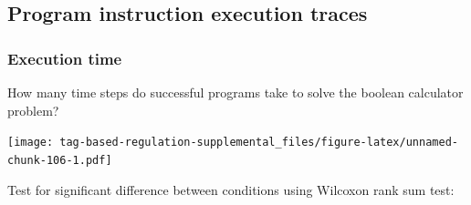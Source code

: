 \documentclass[]{book}
\newenvironment{Shaded}{\begin{snugshade}}{\end{snugshade}}
\newcommand{\CommentTok}[1]{\textcolor[rgb]{0.56,0.35,0.01}{\textit{#1}}}
\newcommand{\DataTypeTok}[1]{\textcolor[rgb]{0.13,0.29,0.53}{#1}}
\newcommand{\FloatTok}[1]{\textcolor[rgb]{0.00,0.00,0.81}{#1}}
\newcommand{\KeywordTok}[1]{\textcolor[rgb]{0.13,0.29,0.53}{\textbf{#1}}}
\newcommand{\NormalTok}[1]{#1}
\newcommand{\OperatorTok}[1]{\textcolor[rgb]{0.81,0.36,0.00}{\textbf{#1}}}
\newcommand{\StringTok}[1]{\textcolor[rgb]{0.31,0.60,0.02}{#1}}
\begin{document}
\hypertarget{program-instruction-execution-traces-3}{%
\subsection{Program instruction execution traces}\label{program-instruction-execution-traces-3}}

\hypertarget{execution-time-3}{%
\subsubsection{Execution time}\label{execution-time-3}}

How many time steps do successful programs take to solve the boolean calculator problem?

\begin{Shaded}
\end{Shaded}

\texttt{[image: tag-based-regulation-supplemental\_files/figure-latex/unnamed-chunk-106-1.pdf]}

Test for significant difference between conditions using Wilcoxon rank sum test:
\end{document}

